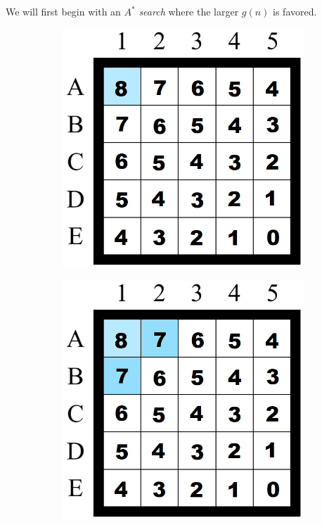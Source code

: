 We will first begin with an $A^*$ \emph{search} where the larger $g(n)$ is favored.
\linebreak
\begin{figure}[H]
\begin{subfigure}[b]{.3\textwidth}
  \centering
  \includegraphics[width=0.95\linewidth]{Report/Part2/g tie breaker/larger g/1.png}  
\end{subfigure}
\begin{subfigure}[b]{.3\textwidth}
  \centering
  \includegraphics[width=0.95\linewidth]{Report/Part2/g tie breaker/larger g/2.png}  

\end{subfigure}
\end{figure}
